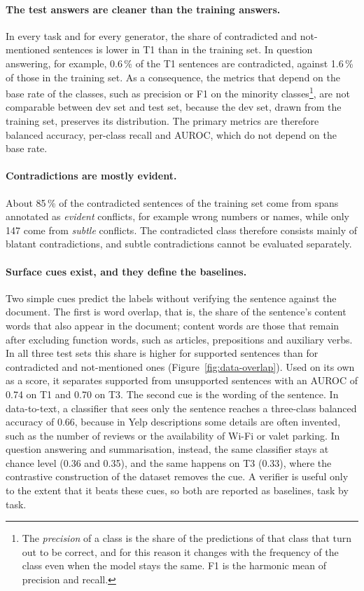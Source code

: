 \paragraph{The test answers are cleaner than the training answers.} In every task and for every generator, the share
of contradicted and not-mentioned sentences is lower in T1 than in the training set. In question answering, for
example, 0.6\,\% of the T1 sentences are contradicted, against 1.6\,\% of those in the training set. As a consequence,
the metrics that depend on the base rate of the classes, such as precision or F1 on the minority
classes\footnote{The \emph{precision} of a class is the share of the predictions of that class that turn out to be
correct, and for this reason it changes with the frequency of the class even when the model stays the same. F1 is the
harmonic mean of precision and recall.}, are
not comparable between dev set and test set, because the dev set, drawn from the training set, preserves its
distribution. The primary metrics are therefore balanced accuracy, per-class recall and AUROC, which do not depend on the
base rate.

\paragraph{Contradictions are mostly evident.} About 85\,\% of the contradicted sentences of the training set come from
spans annotated as \emph{evident} conflicts, for example wrong numbers or names, while only 147 come from \emph{subtle}
conflicts. The contradicted class therefore consists mainly of blatant contradictions, and subtle contradictions cannot
be evaluated separately.

\paragraph{Surface cues exist, and they define the baselines.} Two simple cues predict the labels without verifying the
sentence against the document. The first is word overlap, that is, the share of the sentence's content words that also
appear in the document; content words are those that remain after excluding function words, such as articles,
prepositions and auxiliary verbs. In all three test sets this share is higher for supported sentences than for
contradicted and not-mentioned ones (Figure~\ref{fig:data-overlap}). Used on its own as a score, it separates supported
from unsupported sentences with an AUROC of 0.74 on T1 and 0.70 on T3. The second cue is the wording of the sentence.
In data-to-text, a classifier that sees only the sentence reaches a three-class balanced accuracy of 0.66, because in
Yelp descriptions some details are often invented, such as the number of reviews or the availability of Wi-Fi or valet
parking. In question answering and summarisation, instead, the same classifier stays at chance level (0.36 and 0.35),
and the same happens on T3 (0.33), where the contrastive construction of the dataset removes the cue. A verifier is
useful only to the extent that it beats these cues, so both are reported as baselines, task by task.


